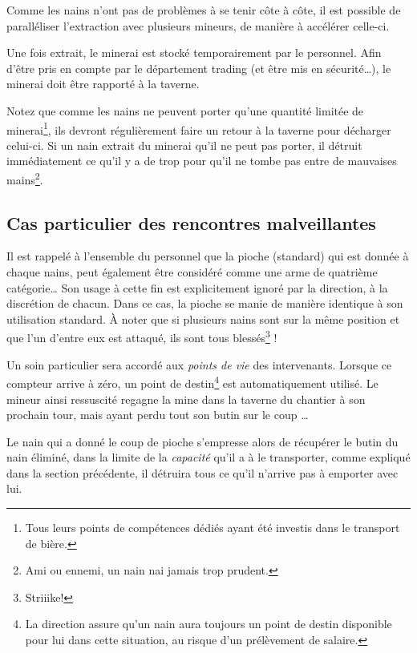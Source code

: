   Comme les nains n'ont pas de problèmes à se tenir côte à côte, il est
  possible de paralléliser l'extraction avec plusieurs mineurs, de manière à
  accélérer celle-ci.

  Une fois extrait, le minerai est stocké temporairement par le personnel. Afin
  d'être pris en compte par le département trading (et être mis en
  sécurité\ldots{}), le minerai doit être rapporté à la taverne.

  Notez que comme les nains ne peuvent porter qu'une quantité limitée de
  minerai\footnote{Tous leurs points de compétences dédiés ayant été investis
  dans le transport de bière.}, ils devront régulièrement faire un retour à la
  taverne pour décharger celui-ci. Si un nain extrait du minerai qu'il ne peut
  pas porter, il détruit immédiatement ce qu'il y a de trop pour qu'il ne tombe
  pas entre de mauvaises mains\footnote{Ami ou ennemi, un nain nai jamais trop
  prudent.}.

\subsection{Cas particulier des rencontres malveillantes}

  Il est rappelé à l'ensemble du personnel que la pioche (standard) qui est
  donnée à chaque nains, peut également être considéré comme une arme de
  quatrième catégorie\ldots{} Son usage à cette fin est explicitement ignoré par
  la direction, à la discrétion de chacun. Dans ce cas, la pioche se manie de
  manière identique à son utilisation standard. À noter que si plusieurs nains
  sont sur la même position et que l'un d'entre eux est attaqué, ils sont tous
  blessés\footnote{Striiike!} !

  Un soin particulier sera accordé aux \textit{points de vie} des intervenants.
  Lorsque ce compteur arrive à zéro, un point de destin\footnote{La direction
  assure qu'un nain aura toujours un point de destin disponible pour lui dans
  cette situation, au risque d'un prélèvement de salaire.} est automatiquement
  utilisé. Le mineur ainsi ressuscité regagne la mine dans la taverne du
  chantier à son prochain tour, mais ayant perdu tout son butin sur le coup
  \ldots{}

  Le nain qui a donné le coup de pioche s'empresse alors de récupérer le butin
  du nain éliminé, dans la limite de la \textit{capacité} qu'il a à le
  transporter, comme expliqué dans la section précédente, il détruira tous ce
  qu'il n'arrive pas à emporter avec lui.
